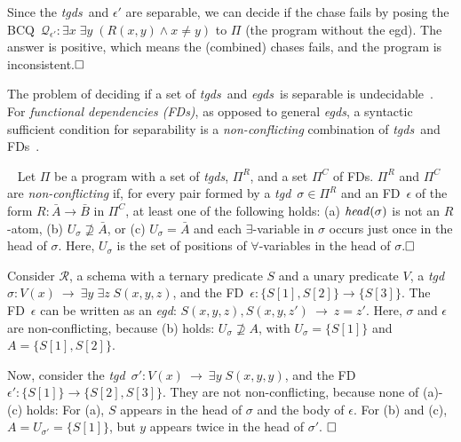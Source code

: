 \documentclass[format=acmsmall, review=false, screen=true]{acmart}
\newcommand{\bcq}{BCQ}
\newcommand{\boxtheorem}{\ensuremath{\hfill \Box}}
\newcommand{\mc}[1]{\mathcal{ #1}}
\newcommand{\nit}[1]{{\it #1}}
\newcommand{\rules}{\Pi^{R}}
\newcommand{\constraints}{\Pi^{C}}
\newcommand{\prg}{\Pi}
\newcommand{\fd}{FD}
\newcommand{\fds}{FDs}
\newcommand{\vectt}[1]{\bar{#1}}
\newcommand{\egds}{{\em egds}}
\newcommand{\egd}{{\em egd}}
\newcommand{\tgds}{{\em tgds}}
\newcommand{\tgd}{{\em tgd}}
\begin{document}
{\begin{example}
Since the \tgds \ and $\epsilon'$ are separable, we can decide if the chase fails by posing the \bcq \ $\mc{Q}_{\epsilon'}:\exists x\;\exists y\;(R(x,y)\wedge x\neq y)$ to $\prg$ (the program without the egd). The answer is positive, which means the (combined) chases fails, and the program is inconsistent.\boxtheorem\end{example}

The problem of deciding if a set of \tgds \ and \egds \ is separable is undecidable~\cite{cali10vldb}. For {\em functional dependencies (FDs)}, as opposed to general \egds, a syntactic sufficient condition for separability is a {\em non-conflicting} combination of \tgds \ and \fds~\cite{cali10vldb,cali12amw}.

\begin{definition}~\cite{cali10vldb} \label{df:non-conf} Let $\prg$ be a program with a set of \tgds, $\rules$, and a set $\constraints$ of \fds. $\rules$ and $\constraints$ are {\it non-conflicting} if, for every pair formed by a \tgd \ $\sigma \in \rules$ and an \fd \ $\epsilon$ of the form $R:\vectt{A} \rightarrow \vectt{B}$ in $\constraints$, at least one of the following holds: (a) $\nit{head}(\sigma)$ is not an $R$-atom, (b) $U_\sigma \not\supseteq \vectt{A}$, or (c) $U_\sigma = \vectt{A}$ and each $\exists$-variable in $\sigma$ occurs just once in the head of $\sigma$. Here, $U_\sigma$ is the set of positions of $\forall$-variables in the head of $\sigma$.\boxtheorem\end{definition}

\begin{example} \label{ex:non-conflicting} Consider $\mc{R}$, a schema with a ternary predicate $S$ and a unary predicate $V$, a \tgd \ $\sigma: V(x) ~\rightarrow~ \exists y\;\exists z\;S(x,y,z)$, and the \fd \ $\epsilon: \{S[1],S[2]\}\rightarrow \{S[3]\}$. The \fd \ $\epsilon$ can be written as an \egd: $S(x,y,z),S(x,y,z') ~\rightarrow~ z=z'$. Here, $\sigma$ and $\epsilon$ are non-conflicting, because (b) holds: $U_\sigma \not\supseteq A$, with $U_\sigma=\{S[1]\}$ and $A=\{S[1],S[2]\}$.

Now, consider the \tgd \ $\sigma': V(x) ~\rightarrow~ \exists y\;S(x,y,y)$, and the \fd \ $\epsilon':\{S[1]\}\rightarrow \{S[2],S[3]\}$. They are not non-conflicting, because none of (a)-(c) holds: For (a), $S$ appears in the head of $\sigma$ and the body of $\epsilon$. For (b) and (c), $A=U_{\sigma'}=\{S[1]\}$, but $y$ appears twice in the head of $\sigma'$.
\boxtheorem\end{example}

}
\end{document}
